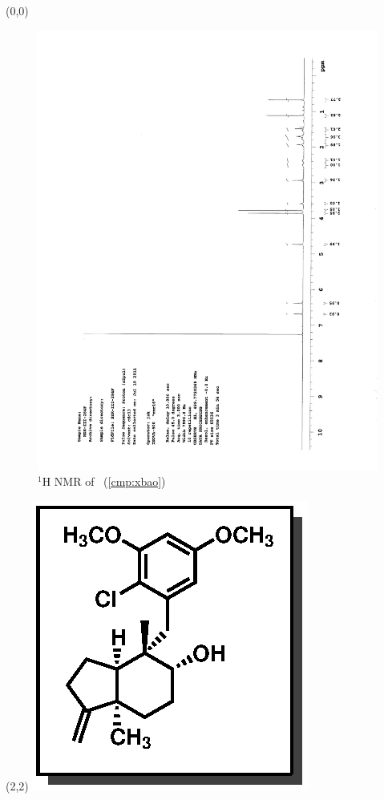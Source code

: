 \begin{textblock}{20}(0,0)
\begin{figure}[htb]
\caption{$^1$H NMR of \CMPxbao\ (\ref{cmp:xbao})}
\includegraphics[scale=0.75, trim = 0mm 0mm 0mm 5mm,
clip]{chp_singlecarbon/images/nmr/xbaoH}
\vspace{-100pt}
\end{figure}
\end{textblock}
\begin{textblock}{1}(2,2)
\includegraphics[scale=0.8, angle=90]{chp_singlecarbon/images/xbao}
\end{textblock}
